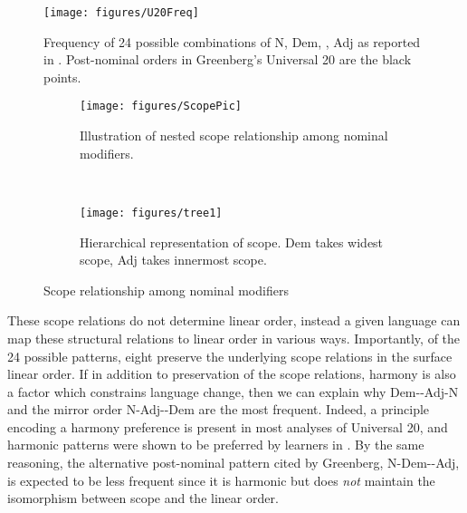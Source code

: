 \documentclass[output=paper]{langsci/langscibook}
\begin{document}
\begin{figure}
\texttt{[image: figures/U20Freq]}
\caption{Frequency of 24 possible combinations of N, Dem, , Adj as reported in \cite{dryer2009order}. Post-nominal orders in Greenberg's Universal 20 are the black points.}\label{fig: U20freq}
\end{figure}

\begin{figure}

\begin{subfigure}[t]{.6\textwidth}
\texttt{[image: figures/ScopePic]}
\caption{Illustration of nested scope relationship among nominal modifiers.}
\end{subfigure}
~~
\begin{subfigure}[t]{.3\textwidth}
\texttt{[image: figures/tree1]}
\caption{Hierarchical representation of scope. Dem takes widest scope, Adj takes innermost scope.}
\end{subfigure}
\caption{Scope relationship among nominal modifiers}\label{fig: U20hierarchy}
\end{figure}

These scope relations do not determine linear order, instead a given language can map these structural relations to linear order in various ways. Importantly, of the 24 possible patterns, eight preserve the underlying scope relations in the surface linear order. If in addition to preservation of the scope relations, harmony is also a factor which constrains language change, then we can explain why Dem--Adj-N and the mirror order N-Adj--Dem are the most frequent. Indeed, a principle encoding a harmony preference is present in most analyses of Universal 20, and harmonic patterns were shown to be preferred by learners in \cite{CulbertsonSmolenskyLegendre12}. By the same reasoning, the alternative post-nominal pattern cited by Greenberg, N-Dem--Adj, is expected to be less frequent since it is harmonic but does \textit{not} maintain the isomorphism between scope and the linear order.  
\end{document}
